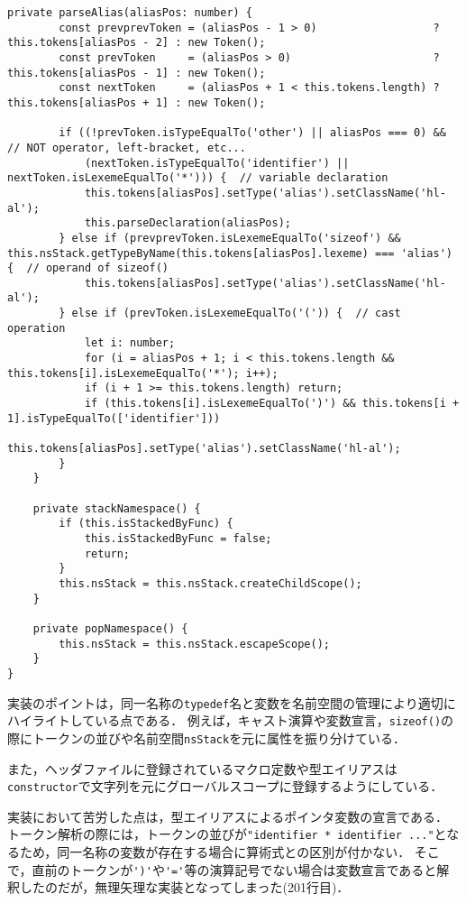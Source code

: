 \documentclass[autodetect-engine,dvi=dvipdfmx,ja=standard,
               a4j,11pt]{bxjsarticle}
\begin{document}
\begin{lstlisting}[caption={Cハイライタ({\tt c.ts})}, label={prog:c}]
    private parseAlias(aliasPos: number) {
        const prevprevToken = (aliasPos - 1 > 0)                  ? this.tokens[aliasPos - 2] : new Token();
        const prevToken     = (aliasPos > 0)                      ? this.tokens[aliasPos - 1] : new Token();
        const nextToken     = (aliasPos + 1 < this.tokens.length) ? this.tokens[aliasPos + 1] : new Token();

        if ((!prevToken.isTypeEqualTo('other') || aliasPos === 0) &&  // NOT operator, left-bracket, etc...
            (nextToken.isTypeEqualTo('identifier') || nextToken.isLexemeEqualTo('*'))) {  // variable declaration
            this.tokens[aliasPos].setType('alias').setClassName('hl-al');
            this.parseDeclaration(aliasPos);
        } else if (prevprevToken.isLexemeEqualTo('sizeof') && this.nsStack.getTypeByName(this.tokens[aliasPos].lexeme) === 'alias') {  // operand of sizeof()
            this.tokens[aliasPos].setType('alias').setClassName('hl-al');
        } else if (prevToken.isLexemeEqualTo('(')) {  // cast operation
            let i: number;
            for (i = aliasPos + 1; i < this.tokens.length && this.tokens[i].isLexemeEqualTo('*'); i++);
            if (i + 1 >= this.tokens.length) return;
            if (this.tokens[i].isLexemeEqualTo(')') && this.tokens[i + 1].isTypeEqualTo(['identifier'])) 
                this.tokens[aliasPos].setType('alias').setClassName('hl-al');
        } 
    }

    private stackNamespace() {
        if (this.isStackedByFunc) {
            this.isStackedByFunc = false;
            return;
        }
        this.nsStack = this.nsStack.createChildScope();
    }

    private popNamespace() {
        this.nsStack = this.nsStack.escapeScope();
    }
}
\end{lstlisting}

実装のポイントは，同一名称の\verb|typedef|名と変数を名前空間の管理により適切にハイライトしている点である．
例えば，キャスト演算や変数宣言，\verb|sizeof()|の際にトークンの並びや名前空間\verb|nsStack|を元に属性を振り分けている．

また，ヘッダファイルに登録されているマクロ定数や型エイリアスは\verb|constructor|で文字列を元にグローバルスコープに登録するようにしている．

実装において苦労した点は，型エイリアスによるポインタ変数の宣言である．
トークン解析の際には，トークンの並びが\verb|"identifier * identifier ..."|となるため，同一名称の変数が存在する場合に算術式との区別が付かない．
そこで，直前のトークンが\verb|')'|や\verb|'='|等の演算記号でない場合は変数宣言であると解釈したのだが，無理矢理な実装となってしまった(201行目)．
\end{document}

